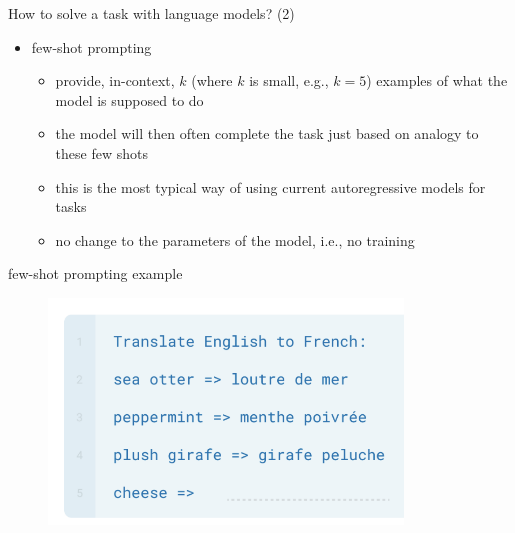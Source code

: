 \begin{frame}{How to solve a task with language models? (2)}

\vfill

\begin{itemize}
    \item few-shot prompting
        \begin{itemize}
            \item provide, in-context,  $k$ (where $k$ is small, e.g., $k=5$) examples of what the model is
supposed to do
        \item the model will then often complete the task
        just based on analogy to these few shots
        \item this is the most typical way of using current
        autoregressive models for tasks
\item no change to the parameters of the model, i.e., no training
\end{itemize}
\end{itemize}

\vfill

\end{frame}

\begin{frame}{few-shot prompting example}

\vfill
	
	\begin{figure}
		\centering
		\includegraphics[height = 6cm]{figure/fewshotprompting} 
	\end{figure}

\vfill

\end{frame}


